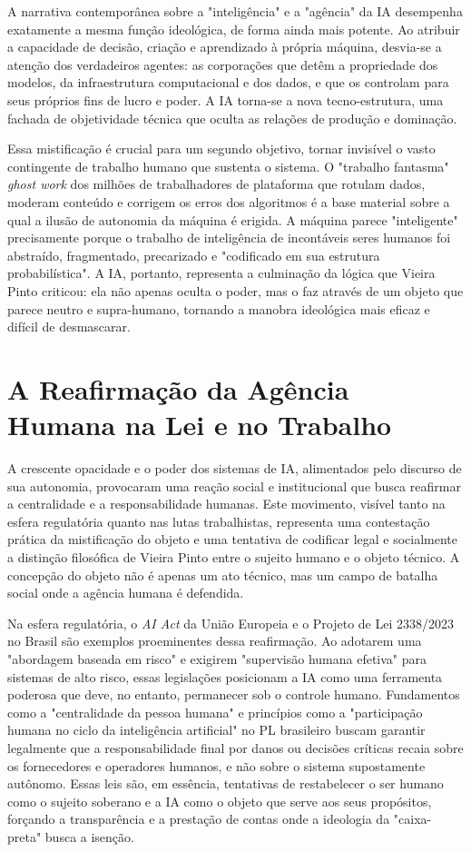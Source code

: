 A narrativa contemporânea sobre a "inteligência" e a "agência" da IA desempenha exatamente a mesma função ideológica, de forma ainda mais potente. Ao atribuir a capacidade de 
decisão, criação e aprendizado à própria máquina, desvia-se a atenção dos verdadeiros agentes: as corporações que detêm a propriedade dos modelos, da infraestrutura 
computacional e dos dados, e que os controlam para seus próprios fins de lucro e poder. A IA torna-se a nova tecno-estrutura, uma fachada de objetividade técnica que oculta as 
relações de produção e dominação.   

Essa mistificação é crucial para um segundo objetivo, tornar invisível o vasto contingente de trabalho humano que sustenta o sistema. O "trabalho fantasma" \textit{ghost work} 
dos milhões de trabalhadores de plataforma que rotulam dados, moderam conteúdo e corrigem os erros dos algoritmos é a base material sobre a qual a ilusão de autonomia da máquina 
é erigida. A máquina parece "inteligente" precisamente porque o trabalho de inteligência de incontáveis seres humanos foi abstraído, fragmentado, precarizado e "codificado em sua 
estrutura probabilística". A IA, portanto, representa a culminação da lógica que Vieira Pinto criticou: ela não apenas oculta o poder, mas o faz através de um objeto que parece 
neutro e supra-humano, tornando a manobra ideológica mais eficaz e difícil de desmascarar. 

\section{A Reafirmação da Agência Humana na Lei e no Trabalho}\label{sec:reafirmacao_agencia_humana}

A crescente opacidade e o poder dos sistemas de IA, alimentados pelo discurso de sua autonomia, provocaram uma reação social e institucional que busca reafirmar a centralidade 
e a responsabilidade humanas. Este movimento, visível tanto na esfera regulatória quanto nas lutas trabalhistas, representa uma contestação prática da mistificação do objeto e 
uma tentativa de codificar legal e socialmente a distinção filosófica de Vieira Pinto entre o sujeito humano e o objeto técnico. A concepção do objeto não é apenas um ato 
técnico, mas um campo de batalha social onde a agência humana é defendida.   

Na esfera regulatória, o \textit{AI Act} da União Europeia e o Projeto de Lei 2338/2023 no Brasil são exemplos proeminentes dessa reafirmação. Ao adotarem uma "abordagem baseada 
em risco" e exigirem "supervisão humana efetiva" para sistemas de alto risco, essas legislações posicionam a IA como uma ferramenta poderosa que deve, no entanto, permanecer sob 
o controle humano. Fundamentos como a "centralidade da pessoa humana" e princípios como a "participação humana no ciclo da inteligência artificial" no PL brasileiro buscam 
garantir legalmente que a responsabilidade final por danos ou decisões críticas recaia sobre os fornecedores e operadores humanos, e não sobre o sistema supostamente autônomo. 
Essas leis são, em essência, tentativas de restabelecer o ser humano como o sujeito soberano e a IA como o objeto que serve aos seus propósitos, forçando a transparência e a 
prestação de contas onde a ideologia da "caixa-preta" busca a isenção.   

